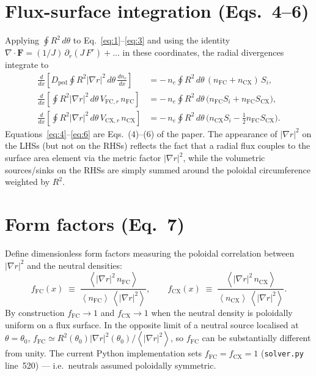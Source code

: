 \documentclass[11pt]{article}
\renewcommand{\ne}{n_{e}}  %
\newcommand{\nfc}{n_{\mathrm{FC}}}
\newcommand{\ncx}{n_{\mathrm{CX}}}
\newcommand{\Vfcr}{V_{\mathrm{FC},r}}
\newcommand{\Vcxr}{V_{\mathrm{CX},r}}
\newcommand{\Si}{S_{i}}
\newcommand{\Scx}{S_{\mathrm{CX}}}
\newcommand{\Dped}{D_{\mathrm{ped}}}
\newcommand{\fFC}{f_{\mathrm{FC}}}
\newcommand{\fCX}{f_{\mathrm{CX}}}
\newcommand{\fsa}[1]{\left\langle #1 \right\rangle}
\newcommand{\gradrsq}{\fsa{|\nabla r|^{2}}}
\begin{document}
\section{Flux-surface integration (Eqs.~4--6)}
\label{sec:fsa-equations}

Applying $\oint R^{2}\,d\theta$ to Eq.~\eqref{eq:1}--\eqref{eq:3} and using
the identity
$\nabla\cdot\bm{F} = (1/J)\,\partial_{r}(J\,F^{r}) + \ldots$ in these
coordinates, the radial divergences integrate to
\begin{align}
  \frac{d}{dx}\!\left[\Dped\oint R^{2}|\nabla r|^{2}\,d\theta\,\frac{d\ne}{dx}\right]
    &= -\,\ne\oint R^{2}\,d\theta\,(\nfc+\ncx)\,\Si, \label{eq:4} \\
  \frac{d}{dx}\!\left[\oint R^{2}|\nabla r|^{2}\,d\theta\,\Vfcr\,\nfc\right]
    &= -\,\ne\oint R^{2}\,d\theta\,\bigl(\nfc\Si + \nfc\Scx\bigr), \label{eq:5} \\
  \frac{d}{dx}\!\left[\oint R^{2}|\nabla r|^{2}\,d\theta\,\Vcxr\,\ncx\right]
    &= -\,\ne\oint R^{2}\,d\theta\,\bigl(\ncx\Si - \tfrac{1}{2}\nfc\Scx\bigr). \label{eq:6}
\end{align}
Equations~\eqref{eq:4}--\eqref{eq:6} are Eqs.~(4)--(6) of the paper.  The
appearance of $|\nabla r|^{2}$ on the LHSs (but not on the RHSs) reflects
the fact that a radial flux couples to the surface area element via the
metric factor $|\nabla r|^{2}$, while the volumetric sources/sinks on the
RHSs are simply summed around the poloidal circumference weighted by
$R^{2}$.

\section{Form factors (Eq.~7)}
\label{sec:form-factors}

Define dimensionless form factors measuring the poloidal correlation
between $|\nabla r|^{2}$ and the neutral densities:
\begin{equation}
  \fFC(x) \;\equiv\; \frac{\fsa{|\nabla r|^{2}\,\nfc}}{\fsa{\nfc}\,\gradrsq},
  \qquad
  \fCX(x) \;\equiv\; \frac{\fsa{|\nabla r|^{2}\,\ncx}}{\fsa{\ncx}\,\gradrsq}.
  \label{eq:7}
\end{equation}
By construction $\fFC\to 1$ and $\fCX\to 1$ when the neutral density is
poloidally uniform on a flux surface.  In the opposite limit of a
neutral source localised at $\theta=\theta_{0}$,
$\fFC\simeq R^{2}(\theta_{0})|\nabla r|^{2}(\theta_{0})/\gradrsq$, so
$\fFC$ can be substantially different from unity.
The current Python implementation sets $\fFC=\fCX=1$
(\texttt{solver.py} line~520) --- i.e.\ neutrals assumed poloidally
symmetric.
\end{document}
